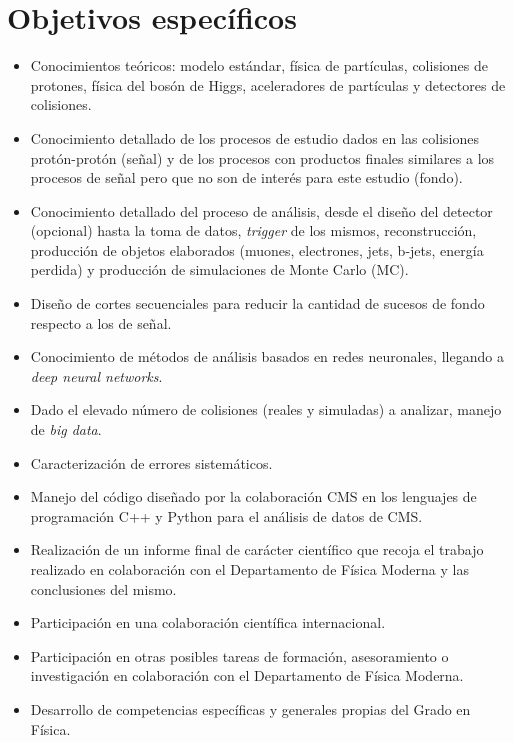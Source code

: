 \documentclass[11pt]{articulo}
\begin{document}
\section{Objetivos espec\'ificos}

\begin{itemize}

\item{Conocimientos te\'oricos: modelo est\'andar, f\'isica de part\'iculas, colisiones de protones, f\'isica del bos\'on de Higgs, aceleradores de part\'iculas y detectores de colisiones.}

\item{Conocimiento detallado de los procesos de estudio dados en las colisiones prot\'on-prot\'on (se\~nal) y de los procesos con productos finales similares a los procesos de se\~nal pero que no son de inter\'es para este estudio (fondo).}

\item{Conocimiento detallado del proceso de an\'alisis, desde el dise\~no del detector (opcional) hasta la toma de datos, {\it trigger} de los mismos, reconstrucci\'on, producci\'on de objetos elaborados (muones, electrones, jets, b-jets, energ\'ia perdida) y producci\'on de simulaciones de Monte Carlo (MC).}

\item{Dise\~no de cortes secuenciales para reducir la cantidad de sucesos de fondo respecto a los de se\~nal.}

\item{Conocimiento de m\'etodos de an\'alisis basados en redes neuronales, llegando a {\it deep neural networks}.}

\item{Dado el elevado n\'umero de colisiones (reales y simuladas) a analizar, manejo de {\it big data}.}

\item{Caracterizaci\'on de errores sistem\'aticos.}

\item{Manejo del c\'odigo dise\~nado por la colaboraci\'on CMS en los lenguajes de programaci\'on C++ y Python para el an\'alisis de datos de CMS.}

\item{Realizaci\'on de un informe final de car\'acter cient\'ifico que recoja el trabajo realizado en colaboraci\'on con el Departamento de F\'isica Moderna y las conclusiones del mismo.}

\item{Participaci\'on en una colaboraci\'on cient\'ifica internacional.}

\item{Participaci\'on en otras posibles tareas de formaci\'on, asesoramiento o investigaci\'on en colaboraci\'on con el Departamento de F\'isica Moderna.}

\item{Desarrollo de competencias espec\'ificas y generales propias del Grado en F\'isica.}

\end{itemize}
\end{document}

